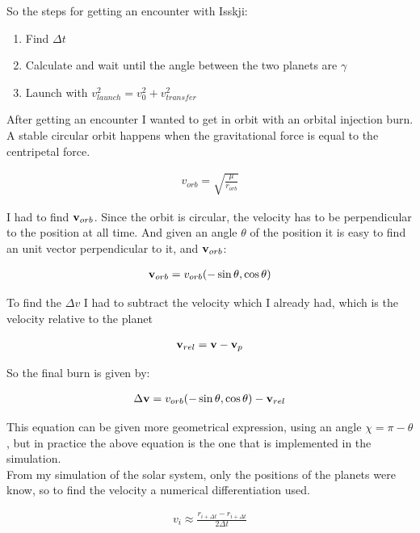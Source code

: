 \documentclass[a4paper, 10pt]{article}
\begin{document}
So the steps for getting an encounter with Isskji:

\begin{enumerate}
\item Find $\Delta t$
\item Calculate and wait until the angle between the two planets are $\gamma$
\item Launch with $v_{launch}^2 = v_0^2 + v_{transfer}^2$ 
\end{enumerate}


After getting an encounter I wanted to get in orbit with an orbital injection burn. A stable circular orbit happens when the gravitational force is equal to the centripetal force.

\begin{align}
v_{orb} = \sqrt{\frac{\mu}{r_{orb}}}
\end{align}

I had to find $\bold{v}_{orb}$. Since the orbit is circular, the velocity has to be perpendicular to the position at all time. And given an angle $\theta$ of the position it is easy to find an unit vector perpendicular to it, and $\bold{v}_{orb}$:

\begin{align}
\bold{v}_{orb} = v_{orb}(-\sin\theta,\cos\theta)
\end{align}

To find the $\Delta v$ I had to subtract the velocity which I already had, which is the velocity relative to the planet

\begin{align}
\bold{v}_{rel} = \bold{v} - \bold{v}_p
\end{align} 

So the final burn is given by:

\begin{align}
\Delta \bold{v} = v_{orb}(-\sin\theta,\cos\theta) - \bold{v}_{rel}
\end{align}

This equation can be given more geometrical expression, using an angle $\chi = \pi - \theta$, but in practice the above equation is the one that is implemented in the simulation.\\

From my simulation of the solar system, only the positions of the planets were know, so to find the velocity a numerical differentiation used. 

\begin{align}
v_i \approx \frac{r_{i+\Delta t} - r_{i+\Delta t}}{2\Delta t}
\end{align}
\end{document}
